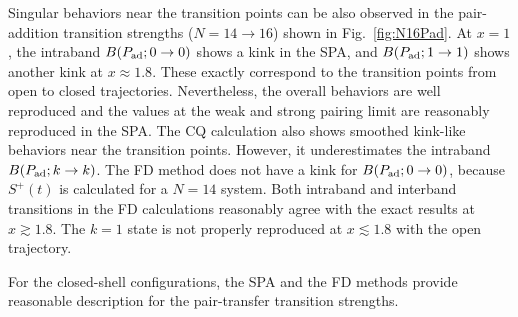 \documentclass[%
superscriptaddress,
preprint,
showpacs,
nofootinbib,
amsmath,amssymb,
aps,
prc,
floatfix ]%
{revtex4-1}
\begin{document}
Singular behaviors near the transition points can be also observed in
the pair-addition transition strengths ($N=14\rightarrow 16$) shown
in Fig.~\ref{fig:N16Pad}. 
At $x=1$, the intraband $B(P_{\rm ad}; 0\rightarrow 0)$ shows a kink
in the SPA,
and $B(P_{\rm ad}; 1\rightarrow 1)$ shows another kink at $x\approx 1.8$.
These exactly correspond to the transition points from open to closed
trajectories.
Nevertheless, the overall behaviors are well reproduced and
the values at the weak and strong pairing limit are reasonably reproduced
in the SPA.
The CQ calculation also shows smoothed kink-like behaviors near the
transition points.
However, it underestimates the intraband $B(P_{\rm ad}; k\rightarrow k)$.
The FD method does not have a kink for $B(P_{\rm ad}; 0\rightarrow 0)$,
because $S^+(t)$ is calculated for a $N=14$ system.
Both intraband and interband transitions in the FD calculations
reasonably agree with the exact results at $x\gtrsim 1.8$.
The $k=1$ state is not properly reproduced at $x\lesssim 1.8$
with the open trajectory.

For the closed-shell configurations,
the SPA and the FD methods provide reasonable description for the
pair-transfer transition strengths.


\end{document}
